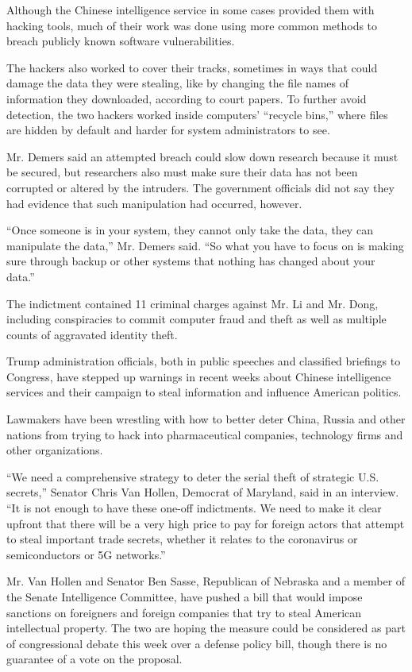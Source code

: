 Although the Chinese intelligence service in some cases provided them
with hacking tools, much of their work was done using more common
methods to breach publicly known software vulnerabilities.

The hackers also worked to cover their tracks, sometimes in ways that
could damage the data they were stealing, like by changing the file
names of information they downloaded, according to court papers. To
further avoid detection, the two hackers worked inside computers'
``recycle bins,'' where files are hidden by default and harder for
system administrators to see.

Mr. Demers said an attempted breach could slow down research because it
must be secured, but researchers also must make sure their data has not
been corrupted or altered by the intruders. The government officials did
not say they had evidence that such manipulation had occurred, however.

``Once someone is in your system, they cannot only take the data, they
can manipulate the data,'' Mr. Demers said. ``So what you have to focus
on is making sure through backup or other systems that nothing has
changed about your data.''

The indictment contained 11 criminal charges against Mr. Li and Mr.
Dong, including conspiracies to commit computer fraud and theft as well
as multiple counts of aggravated identity theft.

Trump administration officials, both in public speeches and classified
briefings to Congress, have stepped up warnings in recent weeks about
Chinese intelligence services and their campaign to steal information
and influence American politics.

Lawmakers have been wrestling with how to better deter China, Russia and
other nations from trying to hack into pharmaceutical companies,
technology firms and other organizations.

``We need a comprehensive strategy to deter the serial theft of
strategic U.S. secrets,'' Senator Chris Van Hollen, Democrat of
Maryland, said in an interview. ``It is not enough to have these one-off
indictments. We need to make it clear upfront that there will be a very
high price to pay for foreign actors that attempt to steal important
trade secrets, whether it relates to the coronavirus or semiconductors
or 5G networks.''

Mr. Van Hollen and Senator Ben Sasse, Republican of Nebraska and a
member of the Senate Intelligence Committee, have pushed a bill that
would impose sanctions on foreigners and foreign companies that try to
steal American intellectual property. The two are hoping the measure
could be considered as part of congressional debate this week over a
defense policy bill, though there is no guarantee of a vote on the
proposal.

